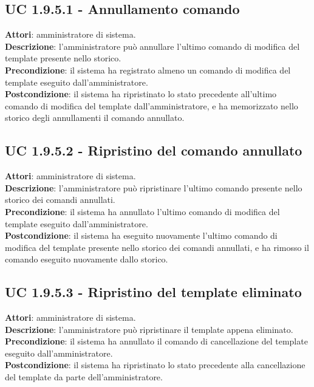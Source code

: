 \subsection{UC 1.9.5.1 - Annullamento comando}{
	\label{uc1.9.5.1}
	\textbf{Attori}: amministratore di sistema. \\
	\textbf{Descrizione}: l'amministratore può annullare l'ultimo comando di modifica del template presente nello storico. \\
	\textbf{Precondizione}: il sistema ha registrato almeno un comando di modifica del template eseguito dall'amministratore.	\\
	\textbf{Postcondizione}: il sistema ha ripristinato lo stato precedente all'ultimo comando di modifica del template dall'amministratore, e ha memorizzato nello storico degli	annullamenti il comando annullato.	\\
	}
\subsection{UC 1.9.5.2 - Ripristino del comando annullato}{
	\label{uc1.9.5.2}
	\textbf{Attori}: amministratore di sistema. \\
	\textbf{Descrizione}: l'amministratore può ripristinare l'ultimo comando presente nello	storico dei comandi annullati. \\
	\textbf{Precondizione}: il sistema ha annullato l'ultimo comando di modifica del template
	eseguito dall'amministratore.	\\
	\textbf{Postcondizione}: il sistema ha eseguito nuovamente l'ultimo comando di modifica	del template presente nello storico dei comandi annullati, e ha rimosso il comando eseguito nuovamente dallo storico.	\\
	}
\subsection{UC 1.9.5.3 - Ripristino del template eliminato}{
	\label{uc1.9.5.3}
	\textbf{Attori}: amministratore di sistema. \\
	\textbf{Descrizione}: l'amministratore può ripristinare il template appena eliminato. \\
	\textbf{Precondizione}: il sistema ha annullato il comando di cancellazione del template eseguito dall'amministratore.	\\
	\textbf{Postcondizione}: il sistema ha ripristinato lo stato precedente alla cancellazione del template da parte dell'amministratore.	\\
	}
